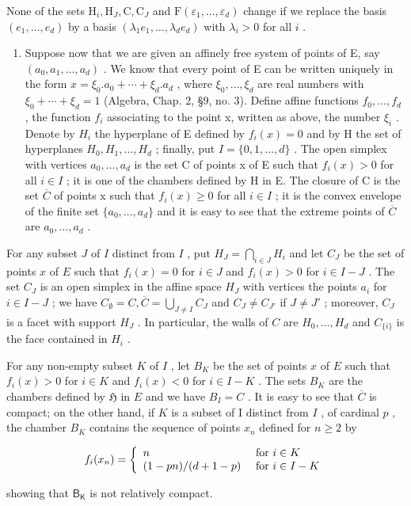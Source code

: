 None of the sets \(\mathrm{H}_i, \mathrm{H}_J, \mathrm{C}, \mathrm{C}_J\) and \(\mathrm{F}(\varepsilon_1, \ldots, \varepsilon_d)\) change if we replace the basis \((e_1, \ldots, e_d)\) by a basis \((\lambda_1 e_1, \ldots, \lambda_d e_d)\) with \(\lambda_i > 0\) for all \(i\) .

\begin{enumerate}
\def\labelenumi{\alph{enumi})}
\setcounter{enumi}{1}
\tightlist
\item
  Suppose now that we are given an affinely free system of points of E, say \((a_{0}, a_{1}, \ldots, a_{d})\) . We know that every point of E can be written uniquely in the form \(x = \xi_{0}.a_{0} + \cdots + \xi_{d}.a_{d}\) , where \(\xi_{0}, \ldots, \xi_{d}\) are real numbers with \(\xi_{0} + \cdots + \xi_{d} = 1\) (Algebra, Chap. 2, §9, no. 3). Define affine functions \(f_{0}, \ldots, f_{d}\) , the function \(f_{i}\) associating to the point x, written as above, the number \(\xi_{i}\) . Denote by \(H_{i}\) the hyperplane of E defined by \(f_{i}(x) = 0\) and by H the set of hyperplanes \(H_{0}, H_{1}, \ldots, H_{d}\) ; finally, put \(I = \{0, 1, \ldots, d\}\) . The open simplex with vertices \(a_{0}, \ldots, a_{d}\) is the set C of points x of E such that \(f_{i}(x) > 0\) for all \(i \in I\) ; it is one of the chambers defined by H in E. The closure of C is the set \(\overline{C}\) of points x such that \(f_{i}(x) \geqslant 0\) for all \(i \in I\) ; it is the convex envelope of the finite set \(\{a_{0}, \ldots, a_{d}\}\) and it is easy to see that the extreme points of \(\overline{C}\) are \(a_{0}, \ldots, a_{d}\) .
\end{enumerate}

For any subset \(J\) of \(I\) distinct from \(I\) , put \(H_J = \bigcap_{i \in J} H_i\) and let \(C_J\) be the set of points \(x\) of \(E\) such that \(f_i(x) = 0\) for \(i \in J\) and \(f_i(x) > 0\) for \(i \in I - J\) . The set \(C_J\) is an open simplex in the affine space \(H_J\) with vertices the points \(a_i\) for \(i \in I - J\) ; we have \(C_\emptyset = C, \overline{C} = \bigcup_{J \neq I} C_J\) and \(C_J \neq C_{J'}\) if \(J \neq J'\) ; moreover, \(C_J\) is a facet with support \(H_J\) . In particular, the walls of \(C\) are \(H_0, \ldots, H_d\) and \(C_{\{i\}}\) is the face contained in \(H_i\) .

For any non-empty subset \(K\) of \(I\) , let \(B_K\) be the set of points \(x\) of \(E\) such that \(f_i(x) > 0\) for \(i \in K\) and \(f_i(x) < 0\) for \(i \in I - K\) . The sets \(B_K\) are the chambers defined by \(\mathfrak{H}\) in \(E\) and we have \(B_I = C\) . It is easy to see that \(\overline{C}\) is compact; on the other hand, if \(K\) is a subset of I distinct from \(I\) , of cardinal \(p\) , the chamber \(B_K\) contains the sequence of points \(x_n\) defined for \(n \geqslant 2\) by

\[
f _ {i} (x _ {n}) = \left\{ \begin{array}{l l} n & \text { for } i \in K \\ (1 - p n) / (d + 1 - p) & \text { for } i \in I - K \end{array} \right.
\]

showing that \(\mathsf{B}_{\mathsf{K}}\) is not relatively compact.

